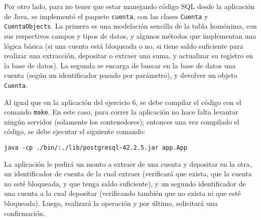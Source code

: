 Por otro lado, para no tener que estar manejando código SQL desde la aplicación de Java, se implementó el paquete \texttt{cuenta}, con las clases \texttt{Cuenta} y \texttt{CuentaObjects}. La primera es una modelación sencilla de la tabla homónima, con sus respectivos campos y tipos de datos, y algunos métodos que implementan una lógica básica (si una cuenta está bloqueada o no, si tiene saldo suficiente para realizar una extracción, depositar o extraer una suma, y actualizar su registro en la base de datos). La segunda se encarga de buscar en la base de datos una cuenta (según un identificador pasado por parámetro), y devolver un objeto \texttt{Cuenta}.

Al igual que en la aplicación del ejercicio 6, se debe compilar el código con el comando \texttt{make}. En este caso, para correr la aplicación no hace falta levantar ningún servidor (solamente los contenedores); entonces una vez compilado el código, se debe ejecutar el siguiente comando:

\begin{lstlisting}[title={Ejemplo de invocación de la aplicación (correr estando parado en el directorio \emph{ej11})}]
java -cp ./bin/:./lib/postgresql-42.2.5.jar app.App 
\end{lstlisting}

La aplicación le pedirá un monto a extraer de una cuenta y depositar en la otra, un identificador de cuenta de la cual extraer (verificará que exista, que la cuenta no esté bloqueada, y que tenga saldo suficiente), y un segundo identificador de una cuenta a la cual depositar (verificando también que no exista ni que esté bloqueada). Luego, realizará la operación y por último, solicitará una confirmación.


\clearpage
\printbibliography



